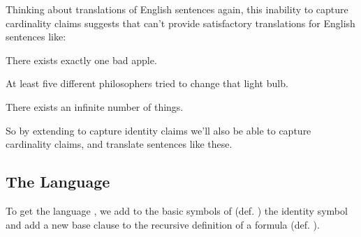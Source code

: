 Thinking about translations of English sentences again, this inability to capture cardinality claims suggests that \GQL{} can't provide satisfactory translations for English sentences like:
\begin{menumerate}
\item There exists exactly one bad apple. 
\item At least five different philosophers tried to change that light bulb.
\item There exists an infinite number of things. 
\end{menumerate}
So by extending \GQL{} to capture identity claims we'll also be able to capture cardinality claims, and translate sentences like these. 

\subsection{The Language \GQLI{}}
To get the language \GQLI{}, we add to the basic symbols of \GQL{} (def. ) the identity symbol \mention{$=$} and add a new base clause to the recursive definition of a \GQL{} formula (def. ). 
